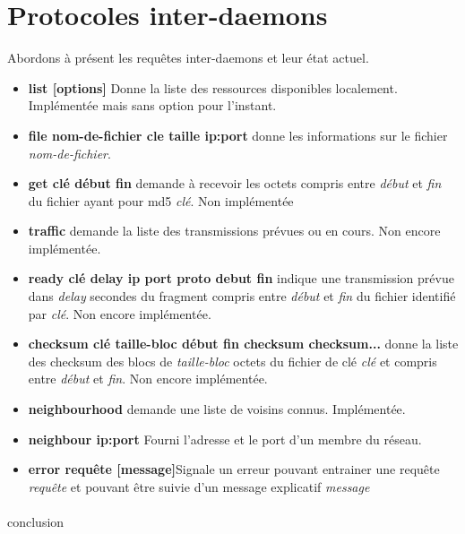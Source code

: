 	\section{Protocoles inter-daemons}
Abordons à présent les requêtes inter-daemons et leur état actuel.

\begin{itemize}
\item{\textbf{list [options]}} Donne la liste des ressources disponibles localement. Implémentée mais sans option pour l'instant.
\item{\textbf{file nom-de-fichier cle taille ip:port}} donne les informations sur le fichier \textit{nom-de-fichier}.
\item{\textbf{get clé début fin}} demande à recevoir les octets compris entre \textit{début} et \textit{fin} du fichier ayant pour md5 \textit{clé}. Non implémentée
\item{\textbf{traffic}} demande la liste des transmissions prévues ou en cours. Non encore implémentée.
\item{\textbf{ready clé delay ip port proto debut fin}} indique une transmission prévue dans \textit{delay} secondes du fragment compris entre \textit{début} et \textit{fin} du fichier identifié par \textit{clé}. Non encore implémentée.
\item{\textbf{checksum clé taille-bloc début fin checksum checksum...}} donne la liste des checksum des blocs de \textit{taille-bloc} octets du fichier de clé \textit{clé} et compris entre \textit{début} et \textit{fin}. Non encore implémentée.
\item{\textbf{neighbourhood}} demande une liste de voisins connus. Implémentée.
\item{\textbf{neighbour ip:port}} Fourni l'adresse et le port d'un membre du réseau.
\item{\textbf{error requête [message]}}Signale un erreur pouvant entrainer une requête \textit{requête} et pouvant être suivie d'un message explicatif \textit{message}
\end{itemize}

	\paragraph*{}conclusion
